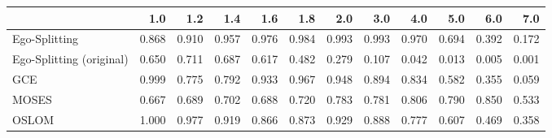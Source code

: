 \begin{tabular}{lrrrrrrrrrrr}
\toprule
{} &   1.0 &   1.2 &   1.4 &   1.6 &   1.8 &   2.0 &   3.0 &   4.0 &   5.0 &   6.0 &   7.0 \\
\midrule
Ego-Splitting            & 0.868 & 0.910 & 0.957 & 0.976 & 0.984 & 0.993 & 0.993 & 0.970 & 0.694 & 0.392 & 0.172 \\
Ego-Splitting (original) & 0.650 & 0.711 & 0.687 & 0.617 & 0.482 & 0.279 & 0.107 & 0.042 & 0.013 & 0.005 & 0.001 \\
GCE                      & 0.999 & 0.775 & 0.792 & 0.933 & 0.967 & 0.948 & 0.894 & 0.834 & 0.582 & 0.355 & 0.059 \\
MOSES                    & 0.667 & 0.689 & 0.702 & 0.688 & 0.720 & 0.783 & 0.781 & 0.806 & 0.790 & 0.850 & 0.533 \\
OSLOM                    & 1.000 & 0.977 & 0.919 & 0.866 & 0.873 & 0.929 & 0.888 & 0.777 & 0.607 & 0.469 & 0.358 \\
\bottomrule
\end{tabular}
